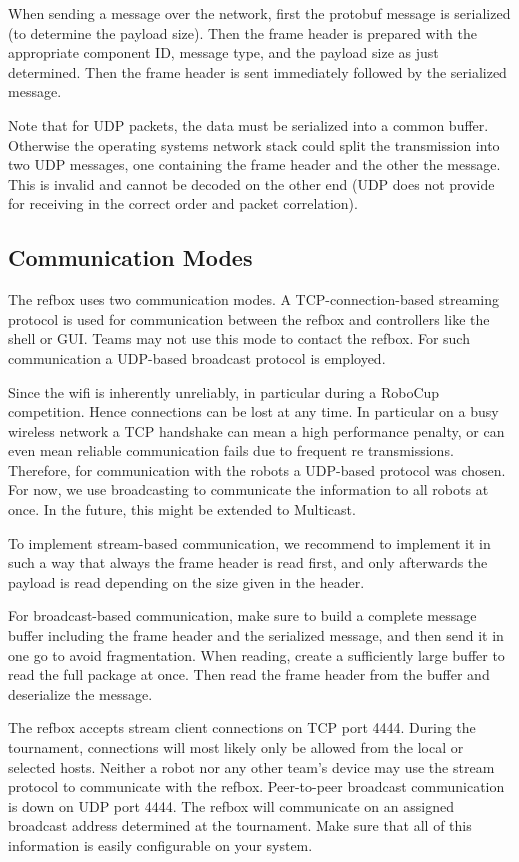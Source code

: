 \documentclass[a4paper]{article}
\begin{document}
When sending a message over the network, first the protobuf message is
serialized (to determine the payload size). Then the frame header is
prepared with the appropriate component ID, message type, and the
payload size as just determined. Then the frame header is sent
immediately followed by the serialized message.

Note that for UDP packets, the data must be serialized into a common
buffer. Otherwise the operating systems network stack could split the
transmission into two UDP messages, one containing the frame header
and the other the message. This is invalid and cannot be decoded on
the other end (UDP does not provide for receiving in the correct order
and packet correlation).

\subsection{Communication Modes}
The refbox uses two communication modes. A TCP-connection-based
streaming protocol is used for communication between the refbox and
controllers like the shell or GUI. Teams may not use this mode to
contact the refbox. For such communication a UDP-based broadcast
protocol is employed.

Since the wifi is inherently unreliably, in particular during a
RoboCup competition. Hence connections can be lost at any time. In
particular on a busy wireless network a TCP handshake can mean a high
performance penalty, or can even mean reliable communication fails
due to frequent re transmissions. Therefore, for communication with the
robots a UDP-based protocol was chosen. For now, we use broadcasting
to communicate the information to all robots at once. In the future,
this might be extended to Multicast.

To implement stream-based communication, we recommend to implement it
in such a way that always the frame header is read first, and only
afterwards the payload is read depending on the size given in the
header.

For broadcast-based communication, make sure to build a complete
message buffer including the frame header and the serialized message,
and then send it in one go to avoid fragmentation. When reading,
create a sufficiently large buffer to read the full package at
once. Then read the frame header from the buffer and deserialize the
message.

The refbox accepts stream client connections on TCP port 4444. During
the tournament, connections will most likely only be allowed from the
local or selected hosts. Neither a robot nor any other team's device
may use the stream protocol to communicate with the
refbox. Peer-to-peer broadcast communication is down on UDP port
4444. The refbox will communicate on an assigned broadcast address
determined at the tournament. Make sure that all of this information
is easily configurable on your system.
\end{document}
